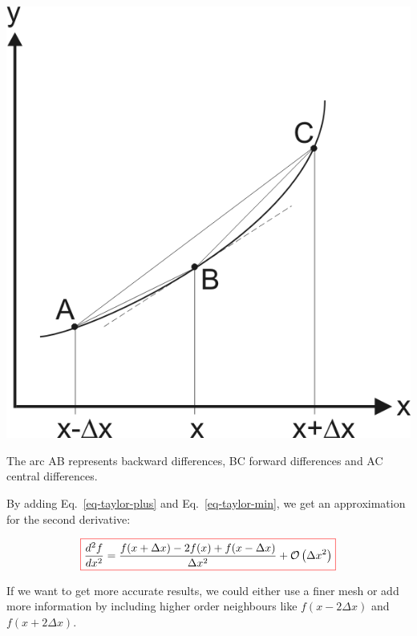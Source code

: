 \begin{marginfigure}
\centering
\includegraphics{numeric/figures/fd}
\caption{The arc AB represents backward differences, BC forward differences and AC central differences.}
\label{fig-fd}
\end{marginfigure}

By adding Eq.~\ref{eq-taylor-plus} and Eq.~\ref{eq-taylor-min}, we get an approximation for the second derivative:

\begin{equation}
\fbox{$\displaystyle
\frac{d^2 f}{d x^2} = \frac{f(x + \Delta x) -2 f(x) + f(x- \Delta x)}{ \Delta x^2} + \mathcal{O}\left(\Delta x^2\right)
$}
\end{equation} 

If we want to get more accurate results, we could either use a finer mesh or add more information by including higher order neighbours like $f(x-2\Delta x)$ and $f(x+2\Delta x)$.



